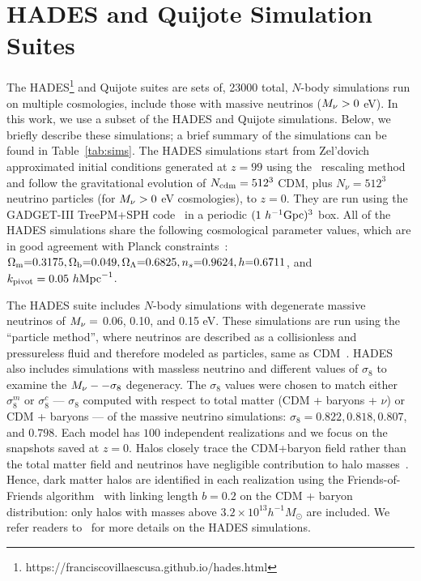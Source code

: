 \section{HADES and Quijote Simulation Suites} \label{sec:hades} 
The HADES\footnote{https://franciscovillaescusa.github.io/hades.html} and Quijote 
suites are sets of, 23000 total, $N$-body simulations run on multiple cosmologies,
include those with massive neutrinos ($M_\nu > 0$ eV). In this work, 
we use a subset of the HADES and Quijote simulations. Below, we briefly describe these simulations; 
a brief summary of the simulations can be found in Table~\ref{tab:sims}. 
The HADES simulations start from Zel'dovich approximated initial conditions 
generated at $z=99$ using the~\cite{zennaro2017a} rescaling method and follow 
the gravitational evolution of $N_{\rm cdm}=512^3$ CDM, plus $N_{\nu}=512^3$ 
neutrino particles (for $M_\nu > 0$ eV cosmologies), to $z=0$. They are run using 
the {\sc GADGET-III} TreePM+SPH code~\citep{springel2005} in a periodic 
$(1~h^{-1}{\rm Gpc})^3$ box. All of the HADES simulations share the following 
cosmological parameter values, which are in good agreement with Planck 
constraints~\cite{ade2016a}: $\Omega_{\rm m}{=}0.3175, \Omega_{\rm b}{=}0.049, \Omega_\Lambda{=}0.6825, n_s{=}0.9624, h{=}0.6711$, 
and $k_{\rm pivot} = 0.05~h{\rm Mpc}^{-1}$. 

The HADES suite includes $N$-body simulations with degenerate massive neutrinos 
of $M_\nu = $ 0.06, 0.10, and 0.15 eV. These simulations are run using the 
``particle method'', where neutrinos are described as a collisionless 
and pressureless fluid and therefore modeled as particles, same as 
CDM~\citep{brandbyge2008,viel2010}. HADES also includes simulations with massless 
neutrino and different values of $\sigma_8$ to examine the $M_\nu--\sigma_8$ 
degeneracy. The $\sigma_8$ values were chosen to match either $\sigma_8^m$ or 
$\sigma_8^{c}$ --- $\sigma_8$ computed with respect to total matter 
(CDM + baryons + $\nu$) or CDM + baryons --- of the massive neutrino simulations: 
$\sigma_8 = 0.822, 0.818, 0.807$, and $0.798$. Each model has $100$ independent 
realizations and we focus on the snapshots saved at $z = 0$. Halos closely 
trace the CDM+baryon field rather than the total matter field and neutrinos 
have negligible contribution to halo masses~\citep[\emph{e.g.}][]{ichiki2012, castorina2014, loverde2014, villaescusa-navarro2014}.
Hence, dark matter halos are identified in each realization using the Friends-of-Friends 
algorithm~\cite[FoF;][]{davis1985} with linking length $b=0.2$ on the CDM + baryon
distribution: only halos with masses above $3.2\times 10^{13} h^{-1}M_\odot$ 
are included. We refer readers to~\cite{villaescusa-navarro2018} for more details 
on the HADES simulations. 

